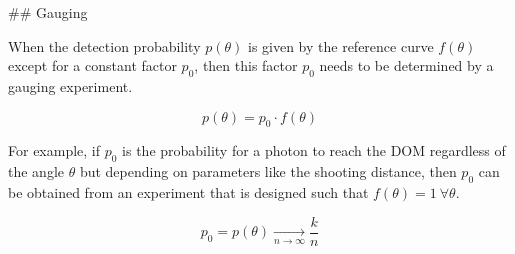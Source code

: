 ## Gauging

When the detection probability $p(\theta)$ is given by the reference curve $f(\theta)$ except for a constant factor $p_0$, then this factor $p_0$ needs to be determined by a gauging experiment.

$$ p(\theta) = p_0 \cdot f(\theta) $$

For example, if $p_0$ is the probability for a photon to reach the DOM regardless of the angle $\theta$ but depending on parameters like the shooting distance, then $p_0$ can be obtained from an experiment that is designed such that $f(\theta) = 1 \ \forall \theta$.

$$ p_0 = p(\theta) \underset{n \to \infty}{\rightarrow} \frac{k}{n} $$

